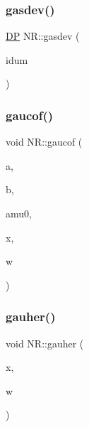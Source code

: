 \subsubsection{\texorpdfstring{gasdev()}{gasdev()}}
{\footnotesize\ttfamily \mbox{\hyperlink{namespaceNR_af6ff762dd605ff477b8e52387253a02a}{DP}} N\+R\+::gasdev (\begin{DoxyParamCaption}\item[{int \&}]{idum }\end{DoxyParamCaption})}

\mbox{\label{namespaceNR_a8bd178e36c704700d52a5bcb56d25548}} 
\subsubsection{\texorpdfstring{gaucof()}{gaucof()}}
{\footnotesize\ttfamily void N\+R\+::gaucof (\begin{DoxyParamCaption}\item[{\mbox{\hyperlink{namespaceNR_ab293e06a6bf799d8a7ed932b6852bcb8}{Vec\+\_\+\+I\+O\+\_\+\+DP}} \&}]{a,  }\item[{\mbox{\hyperlink{namespaceNR_ab293e06a6bf799d8a7ed932b6852bcb8}{Vec\+\_\+\+I\+O\+\_\+\+DP}} \&}]{b,  }\item[{const \mbox{\hyperlink{namespaceNR_af6ff762dd605ff477b8e52387253a02a}{DP}}}]{amu0,  }\item[{\mbox{\hyperlink{namespaceNR_a970094d23441f8ef6a45282a7eb2103d}{Vec\+\_\+\+O\+\_\+\+DP}} \&}]{x,  }\item[{\mbox{\hyperlink{namespaceNR_a970094d23441f8ef6a45282a7eb2103d}{Vec\+\_\+\+O\+\_\+\+DP}} \&}]{w }\end{DoxyParamCaption})}

\mbox{\label{namespaceNR_a3214b0481212ec7e5322d6952177aac6}} 
\subsubsection{\texorpdfstring{gauher()}{gauher()}}
{\footnotesize\ttfamily void N\+R\+::gauher (\begin{DoxyParamCaption}\item[{\mbox{\hyperlink{namespaceNR_a970094d23441f8ef6a45282a7eb2103d}{Vec\+\_\+\+O\+\_\+\+DP}} \&}]{x,  }\item[{\mbox{\hyperlink{namespaceNR_a970094d23441f8ef6a45282a7eb2103d}{Vec\+\_\+\+O\+\_\+\+DP}} \&}]{w }\end{DoxyParamCaption})}

